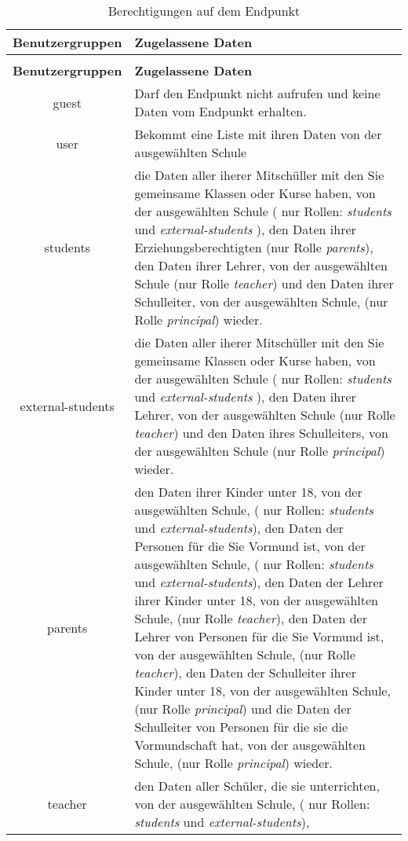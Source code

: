 \begin{longtable}{|c|p{}|}
		\caption{Berechtigungen auf dem Endpunkt}
		\label{tab:end:rest:api:school:users:get:id:right} \\
\hline
\textbf{Benutzergruppen} & \textbf{Zugelassene Daten} \\ \hline
\endfirsthead
\caption{Berechtigungen auf dem Endpunkt}\\
\hline
\textbf{Benutzergruppen} & \textbf{Zugelassene Daten} \\ \hline
\endhead
guest & Darf den Endpunkt nicht aufrufen und keine Daten vom Endpunkt erhalten. \\ \hline
user & Bekommt eine Liste mit ihren Daten von der ausgewählten Schule \\ \hline 
students & die Daten aller iherer Mitschüller mit den Sie gemeinsame Klassen oder Kurse haben, von der ausgewählten Schule ( nur Rollen: \textit{students} und \textit{external-students} ),
           den Daten ihrer Erziehungsberechtigten (nur Rolle \textit{parents}), 
					 den Daten ihrer Lehrer, von der ausgewählten Schule (nur Rolle \textit{teacher}) und 
					 den Daten ihrer Schulleiter, von der ausgewählten Schule, (nur Rolle \textit{principal}) wieder.\\ \hline
external-students &  die Daten aller iherer Mitschüller mit den Sie gemeinsame Klassen oder Kurse haben, von der ausgewählten Schule ( nur Rollen: \textit{students} und \textit{external-students} ),
           den Daten ihrer Lehrer, von der ausgewählten Schule (nur Rolle \textit{teacher}) und 
					 den Daten ihres Schulleiters, von der ausgewählten Schule (nur Rolle \textit{principal}) wieder.\\ \hline
parents & den Daten ihrer Kinder unter 18, von der ausgewählten Schule, ( nur Rollen: \textit{students} und \textit{external-students}), 
					den Daten der Personen für die Sie Vormund ist, von der ausgewählten Schule, ( nur Rollen: \textit{students} und \textit{external-students}), 
					den Daten der Lehrer ihrer Kinder unter 18, von der ausgewählten Schule, (nur Rolle \textit{teacher}),
					den Daten der Lehrer von Personen für die Sie Vormund ist, von der ausgewählten Schule, (nur Rolle \textit{teacher}),
					den Daten der Schulleiter ihrer Kinder unter 18, von der ausgewählten Schule, (nur Rolle \textit{principal}) und
					die Daten der Schulleiter von Personen für die sie die Vormundschaft hat, von der ausgewählten Schule, (nur Rolle \textit{principal})
					wieder.\\ \hline
teacher & den Daten aller Schüler, die sie unterrichten, von der ausgewählten Schule, ( nur Rollen: \textit{students} und \textit{external-students}),

\end{longtable}
